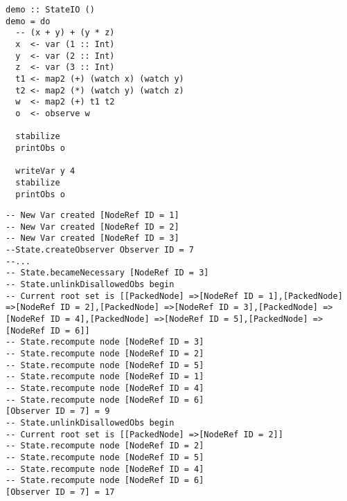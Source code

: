 \documentclass[a4paper, twocolumn]{article}
\begin{document}
\begin{lstlisting}[caption=Example, label={lst:demo}]
demo :: StateIO ()
demo = do
  -- (x + y) + (y * z)
  x  <- var (1 :: Int)
  y  <- var (2 :: Int)
  z  <- var (3 :: Int)
  t1 <- map2 (+) (watch x) (watch y)
  t2 <- map2 (*) (watch y) (watch z)
  w  <- map2 (+) t1 t2
  o  <- observe w

  stabilize
  printObs o

  writeVar y 4
  stabilize
  printObs o
\end{lstlisting}

\begin{lstlisting}[caption=Output of demo, label={lst:output}]
-- New Var created [NodeRef ID = 1]
-- New Var created [NodeRef ID = 2]
-- New Var created [NodeRef ID = 3]
--State.createObserver Observer ID = 7
--...
-- State.becameNecessary [NodeRef ID = 3]
-- State.unlinkDisallowedObs begin
-- Current root set is [[PackedNode] =>[NodeRef ID = 1],[PackedNode] =>[NodeRef ID = 2],[PackedNode] =>[NodeRef ID = 3],[PackedNode] =>[NodeRef ID = 4],[PackedNode] =>[NodeRef ID = 5],[PackedNode] =>[NodeRef ID = 6]]
-- State.recompute node [NodeRef ID = 3]
-- State.recompute node [NodeRef ID = 2]
-- State.recompute node [NodeRef ID = 5]
-- State.recompute node [NodeRef ID = 1]
-- State.recompute node [NodeRef ID = 4]
-- State.recompute node [NodeRef ID = 6]
[Observer ID = 7] = 9
-- State.unlinkDisallowedObs begin
-- Current root set is [[PackedNode] =>[NodeRef ID = 2]]
-- State.recompute node [NodeRef ID = 2]
-- State.recompute node [NodeRef ID = 5]
-- State.recompute node [NodeRef ID = 4]
-- State.recompute node [NodeRef ID = 6]
[Observer ID = 7] = 17
\end{lstlisting}
\end{document}
